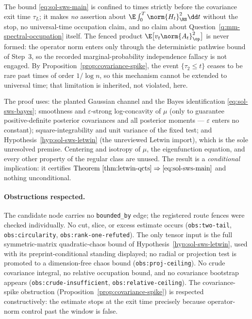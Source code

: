 \documentclass[../main.tex]{subfiles}
\begin{document}
\begin{remark}
\label{rem:sol-sws-scope}
The bound \eqref{eq:sol-sws-main} is confined to times strictly before the covariance
exit time $\tau_L$; it makes \emph{no} assertion about
$\E\int_0^T\norm{H_t}_{\HS}^2\dd t$ without the stop, no universal-time occupation
claim, and no claim about Question~\ref{q:mm-spectral-occupation} itself.  The fenced
product $\E\bigl[v_t\norm{A_t}_\op^2\bigr]$ is never formed: the operator norm enters
only through the deterministic pathwise bound of Step~3, so the recorded
marginal-probability independence fallacy is not engaged.  By
Proposition~\ref{prop:covariance-spike}, the event $\{\tau_2\le t\}$ ceases to be rare
past times of order $1/\log n$, so this mechanism cannot be extended to universal time;
that limitation is inherited, not violated, here.
\end{remark}

\begin{remark}
\label{rem:sol-sws-hypotheses}
The proof uses: the planted Gaussian channel and the Bayes identification
\eqref{eq:sol-sws-bayes}; smoothness and $\varepsilon$-strong log-concavity of $\mu$
(only to guarantee positive-definite posterior covariances and all posterior moments —
$\varepsilon$ enters no constant); square-integrability and unit variance of the fixed
test; and Hypothesis~\ref{hyp:sol-sws-letwin} (the unreviewed Letwin import), which is
the sole unresolved premise.  Centering and isotropy of $\mu$, the eigenfunction
equation, and every other property of the regular class are unused.  The result is a
\emph{conditional} implication: it certifies
$\text{Theorem~\ref{thm:letwin-qcts}}\Rightarrow\eqref{eq:sol-sws-main}$ and nothing
unconditional.
\end{remark}

\paragraph{Obstructions respected.}
The candidate node carries no \texttt{bounded\_by} edge; the registered route fences
were checked individually.  No cut, slice, or excess estimate occurs
(\texttt{obs:two-tail}, \texttt{obs:circularity}, \texttt{obs:rank-one-refuted}).  The
only tensor input is the full symmetric-matrix quadratic-chaos bound of
Hypothesis~\ref{hyp:sol-sws-letwin}, used with its preprint-conditional standing
displayed; no radial or projection test is promoted to a dimension-free chaos bound
(\texttt{obs:proj-ceiling}).  No crude covariance integral, no relative occupation
bound, and no covariance bootstrap appears (\texttt{obs:crude-insufficient},
\texttt{obs:relative-ceiling}).  The covariance-spike obstruction
(Proposition~\ref{prop:covariance-spike}) is respected constructively: the estimate
stops at the exit time precisely because operator-norm control past the window is
false.
\end{document}
